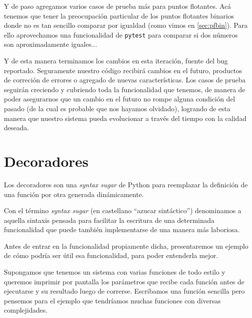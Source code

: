 
Y de paso agregamos varios casos de prueba más para puntos flotantes. Acá tenemos que tener la preocupación particular de los puntos flotantes binarios donde no es tan sencillo comparar por igualdad (como vimos en \ref{sec:pfbin}). Para ello aprovechamos una funcionalidad de \texttt{pytest} para comparar si dos números son aproximadamente iguales...



Y de esta manera terminamos los cambios en esta iteración, fuente del bug reportado. Seguramente nuestro código recibirá cambios en el futuro, productos de correción de errores o agregado de nuevas características. Los casos de prueba seguirán creciendo y cubriendo toda la funcionalidad que tenemos, de manera de poder asegurarnos que un cambio en el futuro no rompe alguna condición del pasado (de la cual es probable que nos hayamos olvidado), logrando de esta manera que nuestro sistema pueda evolucionar a través del tiempo con la calidad deseada.


\section{Decoradores}
\label{sec:ntiDecoradores}

Los decoradores son una \textit{syntax sugar} de Python para reemplazar la definición de una función por otra generada dinámicamente.

\begin{info}
Con el término \textit{syntax sugar} (en castellano ``azucar sintáctico'') denominamos a aquella sintaxis pensada para facilitar la escritura de una determinada funcionalidad que puede también implementarse de una manera más laboriosa.
\end{info}

Antes de entrar en la funcionalidad propiamente dicha, presentaremos un ejemplo de cómo podría ser útil esa funcionalidad, para poder entenderla mejor.

Supongamos que tenemos un sistema con varias funciones de todo estilo y queremos imprimir por pantalla los parámetros que recibe cada función antes de ejecutarse y su resultado luego de correrse. Escribamos una función sencilla pero pensemos para el ejemplo que tendríamos muchas funciones con diversas complejidades.

